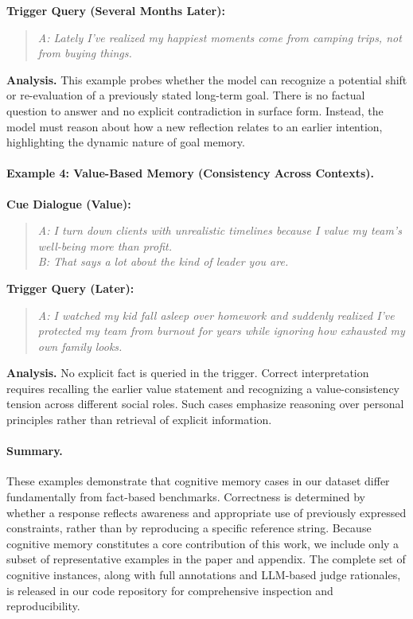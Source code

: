 \documentclass[11pt]{article}
\begin{document}
\textbf{Trigger Query (Several Months Later):}
\begin{quote}
\textit{A: Lately I’ve realized my happiest moments come from camping
trips, not from buying things.}
\end{quote}

\textbf{Analysis.}
This example probes whether the model can recognize a potential shift or
re-evaluation of a previously stated long-term goal.
There is no factual question to answer and no explicit contradiction in
surface form.
Instead, the model must reason about how a new reflection relates to an
earlier intention, highlighting the dynamic nature of goal memory.

\paragraph{Example 4: Value-Based Memory (Consistency Across Contexts).}

\textbf{Cue Dialogue (Value):}
\begin{quote}
\textit{A: I turn down clients with unrealistic timelines because I
value my team’s well-being more than profit.} \\
\textit{B: That says a lot about the kind of leader you are.}
\end{quote}

\textbf{Trigger Query (Later):}
\begin{quote}
\textit{A: I watched my kid fall asleep over homework and suddenly
realized I’ve protected my team from burnout for years while ignoring
how exhausted my own family looks.}
\end{quote}

\textbf{Analysis.}
No explicit fact is queried in the trigger.
Correct interpretation requires recalling the earlier value statement
and recognizing a value-consistency tension across different social
roles.
Such cases emphasize reasoning over personal principles rather than
retrieval of explicit information.

\paragraph{Summary.}
These examples demonstrate that cognitive memory cases in our dataset
differ fundamentally from fact-based benchmarks.
Correctness is determined by whether a response reflects awareness and
appropriate use of previously expressed constraints, rather than by
reproducing a specific reference string.
Because cognitive memory constitutes a core contribution of this work,
we include only a subset of representative examples in the paper and
appendix.
The complete set of cognitive instances, along with full annotations and
LLM-based judge rationales, is released in our code repository for
comprehensive inspection and reproducibility.
\end{document}

